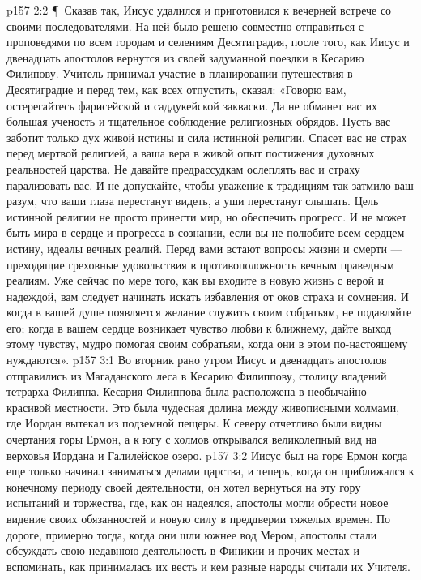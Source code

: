 \vs p157 2:2 \P\ Сказав так, Иисус удалился и приготовился к вечерней встрече со своими последователями. На ней было решено совместно отправиться с проповедями по всем городам и селениям Десятиградия, после того, как Иисус и двенадцать апостолов вернутся из своей задуманной поездки в Кесарию Филипову. Учитель принимал участие в планировании путешествия в Десятиградие и перед тем, как всех отпустить, сказал: «Говорю вам, остерегайтесь фарисейской и саддукейской закваски. Да не обманет вас их большая ученость и тщательное соблюдение религиозных обрядов. Пусть вас заботит только дух живой истины и сила истинной религии. Спасет вас не страх перед мертвой религией, а ваша вера в живой опыт постижения духовных реальностей царства. Не давайте предрассудкам ослеплять вас и страху парализовать вас. И не допускайте, чтобы уважение к традициям так затмило ваш разум, что ваши глаза перестанут видеть, а уши перестанут слышать. Цель истинной религии не просто принести мир, но обеспечить прогресс. И не может быть мира в сердце и прогресса в сознании, если вы не полюбите всем сердцем истину, идеалы вечных реалий. Перед вами встают вопросы жизни и смерти --- преходящие греховные удовольствия в противоположность вечным праведным реалиям. Уже сейчас по мере того, как вы входите в новую жизнь с верой и надеждой, вам следует начинать искать избавления от оков страха и сомнения. И когда в вашей душе появляется желание служить своим собратьям, не подавляйте его; когда в вашем сердце возникает чувство любви к ближнему, дайте выход этому чувству, мудро помогая своим собратьям, когда они в этом по\hyp{}настоящему нуждаются».
\vs p157 3:1 Во вторник рано утром Иисус и двенадцать апостолов отправились из Магаданского леса в Кесарию Филиппову, столицу владений тетрарха Филиппа. Кесария Филиппова была расположена в необычайно красивой местности. Это была чудесная долина между живописными холмами, где Иордан вытекал из подземной пещеры. К северу отчетливо были видны очертания горы Ермон, а к югу с холмов открывался великолепный вид на верховья Иордана и Галилейское озеро.
\vs p157 3:2 Иисус был на горе Ермон когда еще только начинал заниматься делами царства, и теперь, когда он приближался к конечному периоду своей деятельности, он хотел вернуться на эту гору испытаний и торжества, где, как он надеялся, апостолы могли обрести новое видение своих обязанностей и новую силу в преддверии тяжелых времен. По дороге, примерно тогда, когда они шли южнее вод Мером, апостолы стали обсуждать свою недавнюю деятельность в Финикии и прочих местах и вспоминать, как принималась их весть и кем разные народы считали их Учителя.
